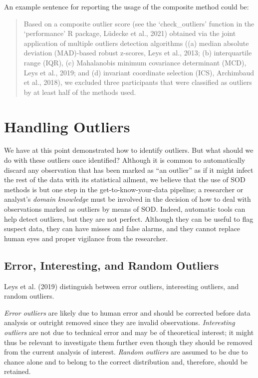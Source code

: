 \documentclass[
]{article}
\begin{document}
An example sentence for reporting the usage of the composite method could be:

\begin{quote}
Based on a composite outlier score (see the `check\_outliers' function in the `performance' R package, Lüdecke et al., 2021) obtained via the joint application of multiple outliers detection algorithms ((a) median absolute deviation (MAD)-based robust z-scores, Leys et al., 2013; (b) interquartile range (IQR), (c) Mahalanobis minimum covariance determinant (MCD), Leys et al., 2019; and (d) invariant coordinate selection (ICS), Archimbaud et al., 2018), we excluded three participants that were classified as outliers by at least half of the methods used.
\end{quote}

\hypertarget{handling-outliers}{%
\section{Handling Outliers}\label{handling-outliers}}

We have at this point demonstrated how to identify outliers. But what should we do with these outliers once identified? Although it is common to automatically discard any observation that has been marked as ``an outlier'' as if it might infect the rest of the data with its statistical ailment, we believe that the use of SOD methods is but one step in the get-to-know-your-data pipeline; a researcher or analyst's \emph{domain knowledge} must be involved in the decision of how to deal with observations marked as outliers by means of SOD. Indeed, automatic tools can help detect outliers, but they are not perfect. Although they can be useful to flag suspect data, they can have misses and false alarms, and they cannot replace human eyes and proper vigilance from the researcher.

\hypertarget{error-interesting-and-random-outliers}{%
\subsection{Error, Interesting, and Random Outliers}\label{error-interesting-and-random-outliers}}

Leys et al. (2019) distinguish between error outliers, interesting outliers, and random outliers.

\emph{Error outliers} are likely due to human error and should be corrected before data analysis or outright removed since they are invalid observations. \emph{Interesting outliers} are not due to technical error and may be of theoretical interest; it might thus be relevant to investigate them further even though they should be removed from the current analysis of interest. \emph{Random outliers} are assumed to be due to chance alone and to belong to the correct distribution and, therefore, should be retained.
\end{document}
